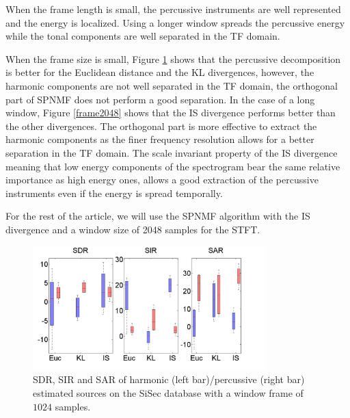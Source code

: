 \documentclass[journal]{IEEEtran}
\begin{document}
When the frame length is small, the percussive instruments are well represented and the energy is localized. Using a longer window spreads the percussive energy while the tonal components are well separated in the TF domain.

When the frame size is small, Figure \ref{frame1024} shows that the percussive decomposition is better for the Euclidean distance and the KL divergences, however, the harmonic components are not well separated in the TF domain, the orthogonal part of SPNMF does not perform a good separation.  
In the case of a long window, Figure \ref{frame2048} shows that the IS divergence performs better than the other divergences. The orthogonal part is more effective to extract the harmonic components as the finer frequency resolution allows for a better separation in the TF domain. The scale invariant property of the IS divergence meaning that low energy components of the spectrogram bear the same relative importance as high energy ones, allows a good extraction of the percussive instruments even if the energy is spread temporally.


For the rest of the article, we will use the SPNMF algorithm with the IS divergence and a window size of 2048 samples for the STFT.


\begin{figure}[htb]

  \centering 
  \includegraphics[width=9cm]{fig/DivergenceFrame1024.png}
  \caption{\label{frame1024} SDR, SIR and SAR of harmonic (left bar)/percussive (right bar) estimated sources on the SiSec database with a window frame of $1024$ samples.}
  
\end{figure}
\end{document}
